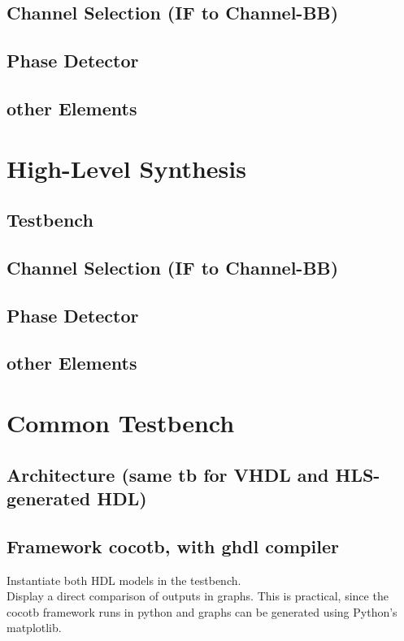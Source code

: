   \subsection{Channel Selection (IF to Channel-BB)}
  \subsection{Phase Detector}
  \subsection{other Elements}

  \section{High-Level Synthesis}
  \subsection{Testbench}
  \subsection{Channel Selection (IF to Channel-BB)}
  \subsection{Phase Detector}
  \subsection{other Elements}

\section{Common Testbench}
  \subsection{Architecture (same tb for VHDL and HLS-generated HDL)}
  \subsection{Framework cocotb, with ghdl compiler}
  Instantiate both HDL models in the testbench.\\
  Display a direct comparison of outputs in graphs. This is practical, since the cocotb framework runs in python and graphs can be generated using Python's matplotlib.

